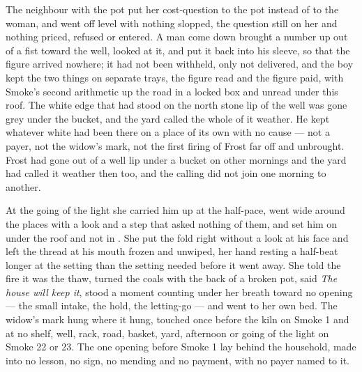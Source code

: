 The neighbour with the pot put her cost-question to the pot instead of to the woman, and went off level with nothing slopped, the question still on her and nothing priced, refused or entered. A man come down  brought a number up out of a fist toward the well, looked at it, and put it back into his sleeve, so that the figure arrived nowhere; it had not been withheld, only not delivered, and the boy kept the two things on separate trays, the figure read and the figure paid, with Smoke's second arithmetic up the road in a locked box and unread under this roof. The white edge that had stood on the north stone lip of the well was gone grey under the bucket, and the yard called the whole of it weather. He kept whatever white had been there on a place of its own with no cause --- not a payer, not the widow's mark, not the first firing of Frost far off and unbrought. Frost had gone out of a well lip under a bucket on other mornings and the yard had called it weather then too, and the calling did not join one morning to another.

\scenebreak

At the going of the light she carried him up at the half-pace, went wide around the places with a look and a step that asked nothing of them, and set him on  under the roof and not in . She put the fold right without a look at his face and left the thread at his mouth frozen and unwiped, her hand resting a half-beat longer at the setting than the setting needed before it went away. She told the fire it was the thaw, turned the coals with the back of a broken pot, said \emph{The house will keep it}, stood a moment counting under her breath toward no opening --- the small intake, the hold, the letting-go --- and went to her own bed. The widow's mark hung where it hung, touched once before the kiln on Smoke 1 and at no shelf, well, rack, road, basket, yard, afternoon or going of the light on Smoke 22 or 23. The one opening before Smoke 1 lay behind the household, made into no lesson, no sign, no mending and no payment, with no payer named to it.

